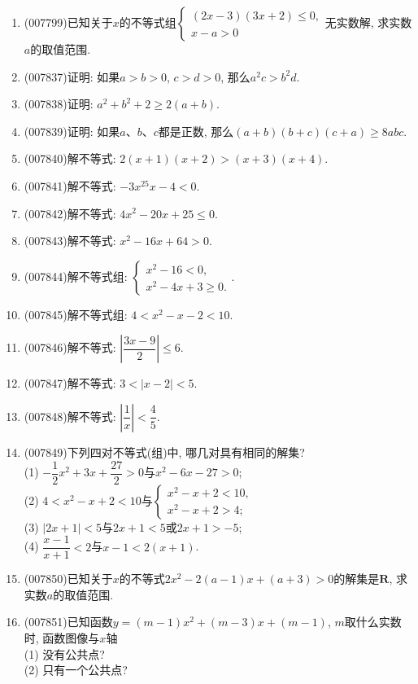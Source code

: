 \documentclass[10pt,a4paper]{article}
\begin{document}
\begin{enumerate}[1.]
\item {\tiny (007799)}已知关于$x$的不等式组$\begin{cases} (2x-3)(3x+2)\le 0, \\ x-a>0 \end{cases}$无实数解, 求实数$a$的取值范围.
\item {\tiny (007837)}证明: 如果$a>b>0$, $c>d>0$, 那么$a^2c>b^2d$.
\item {\tiny (007838)}证明: $a^2+b^2+2\ge 2(a+b)$.
\item {\tiny (007839)}证明: 如果$a$、$b$、$c$都是正数, 那么$(a+b)(b+c)(c+a)\ge 8abc$.
\item {\tiny (007840)}解不等式: $2(x+1)(x+2)>(x+3)(x+4)$.
\item {\tiny (007841)}解不等式: $-3x^25x-4<0$.
\item {\tiny (007842)}解不等式: $4x^2-20x+25\le 0$.
\item {\tiny (007843)}解不等式: $x^2-16x+64>0$.
\item {\tiny (007844)}解不等式组: $\begin{cases} x^2-16<0, \\ x^2-4x+3\ge 0. \end{cases}$.
\item {\tiny (007845)}解不等式组: $4<x^2-x-2<10$.
\item {\tiny (007846)}解不等式: $|\dfrac{3x-9}2|\le 6$.
\item {\tiny (007847)}解不等式: $3<|x-2|<5$.
\item {\tiny (007848)}解不等式: $|\dfrac 1x|<\dfrac 45$.
\item {\tiny (007849)}下列四对不等式(组)中, 哪几对具有相同的解集?\\
(1) $-\dfrac 12x^2+3x+\dfrac{27}2>0$与$x^2-6x-27>0$;\\
(2) $4<x^2-x+2<10$与$\begin{cases} x^2-x+2<10, \\ x^2-x+2>4; \end{cases}$\\
(3) $|2x+1|<5$与$2x+1<5$或$2x+1>-5$;\\
(4) $\dfrac{x-1}{x+1}<2$与$x-1<2(x+1)$.
\item {\tiny (007850)}已知关于$x$的不等式$2x^2-2(a-1)x+(a+3)>0$的解集是$\mathbf{R}$, 求实数$a$的取值范围.
\item {\tiny (007851)}已知函数$y=(m-1)x^2+(m-3)x+(m-1)$, $m$取什么实数时, 函数图像与$x$轴\\
(1) 没有公共点?\\
(2) 只有一个公共点?\\

\end{enumerate}
\end{document}
